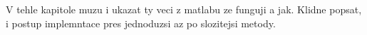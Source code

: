 V tehle kapitole muzu i ukazat ty veci z matlabu ze funguji a jak.
Klidne popsat, i postup implemntace pres jednoduzsi az po slozitejsi metody.




